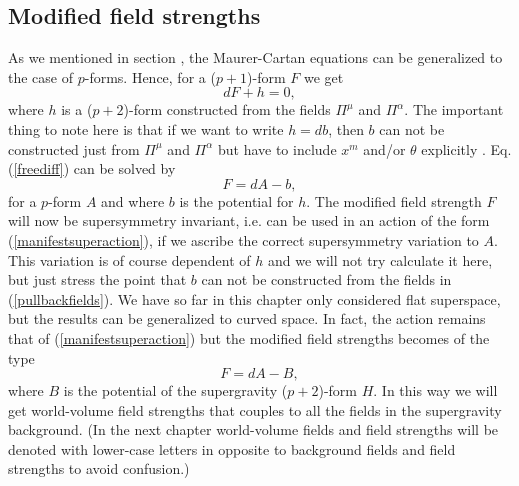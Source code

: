 \subsection{Modified field strengths}
As we mentioned in section , the Maurer-Cartan equations can be generalized to the case of $p$-forms. 
Hence, for a ($p+1$)-form $F$ we get
\begin{equation}
dF+h=0,
\label{freediff}
\end{equation}
where $h$ is a ($p+2$)-form constructed from the fields $\Pi^{\mu}$ and $\Pi^{\alpha}$. 
The important thing to note here is that if we want to write $h=db$, then $b$ can not be constructed just from $\Pi^{\mu}$ and $\Pi^{\alpha}$ but have to include $x^m$ and/or $\theta$ explicitly \cite{valskriven}.
Eq. (\ref{freediff}) can be solved by
\begin{equation}
F=dA-b,
\end{equation}
for a $p$-form $A$ and where $b$ is the potential for $h$. The modified field strength $F$ will now be supersymmetry invariant, i.e. 
can be used in an action of the form (\ref{manifestsuperaction}), if we ascribe the correct supersymmetry variation to $A$. 
This variation is of course dependent of $h$ and we will not try calculate it here, but just stress the point that $b$ can not be constructed from the fields in (\ref{pullbackfields}). 
\newline 
We have so far in this chapter only considered flat superspace, but the results can be generalized to curved space. In fact, the action remains that of (\ref{manifestsuperaction}) 
but the modified field strengths becomes of the type
\begin{equation}
F=dA-B,
\label{axnl}
\end{equation}
where $B$ is the potential of the supergravity ($p+2$)-form $H$. In this way we will get world-volume field strengths that couples to all 
the fields in the supergravity background. (In the next chapter world-volume fields and field strengths will be denoted with lower-case letters in opposite to background fields and field strengths to avoid confusion.)

